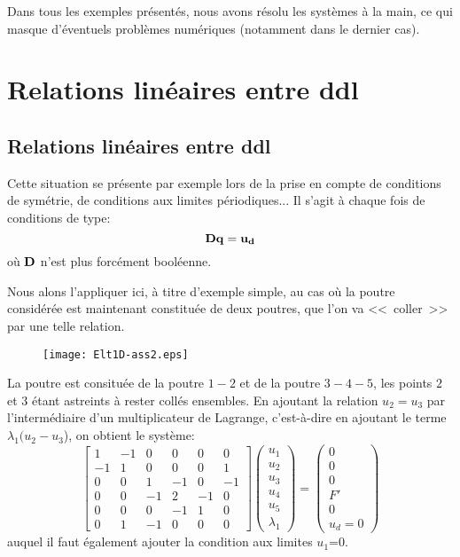\medskip
Dans tous les exemples présentés, nous avons résolu les systèmes à la main, ce qui masque d'éventuels
problèmes numériques (notamment dans le dernier cas).

\medskip
\ifVersionAvecExemplesSepares
   \section{Relations linéaires entre ddl}
\else
   \subsection{Relations linéaires entre ddl}
\fi
Cette situation se présente par exemple lors de la prise en compte de conditions de symétrie, de conditions aux limites périodiques... Il s'agit à chaque fois de conditions de type:
\begin{equation}
\mathbf{D}\mathbf{q} = \mathbf{u_d}
\end{equation}
où $\mathbf{D}$ n'est plus forcément booléenne.

\medskip
Nous alons l'appliquer ici, à titre d'exemple simple, au cas où la poutre considérée est maintenant constituée de deux poutres, que l'on va <<~coller~>> par une telle relation.
\begin{figure}[ht]
\centering
\texttt{[image: Elt1D-ass2.eps]}
\end{figure}
La poutre est consituée de la poutre $1-2$ et de la poutre $3-4-5$, les points $2$ et $3$ étant astreints à rester collés ensembles.
\medskipvm
En ajoutant la relation $u_2=u_3$ par l'intermédiaire d'un multiplicateur de Lagrange, c'est-à-dire en ajoutant le terme $\lambda_1(u_2-u_3$), on obtient le système:
\begin{equation}
\begin{bmatrix}1&-1&0&0&0&0 \\ -1&1&0&0&0&1 \\ 0&0&1&-1&0&-1\\ 0&0&-1&2&-1&0\\ 0&0&0&-1&1&0 \\ 0&1&-1&0&0&0
\end{bmatrix}
\begin{pmatrix} u_1\\u_2\\u_3\\u_4\\ u_5\\ \lambda_1 \end{pmatrix}
=
\begin{pmatrix} 0\\0\\0\\F' \\ 0 \\ u_d=0\end{pmatrix}
\end{equation}
auquel il faut également ajouter la condition aux limites $u_1$=0.

